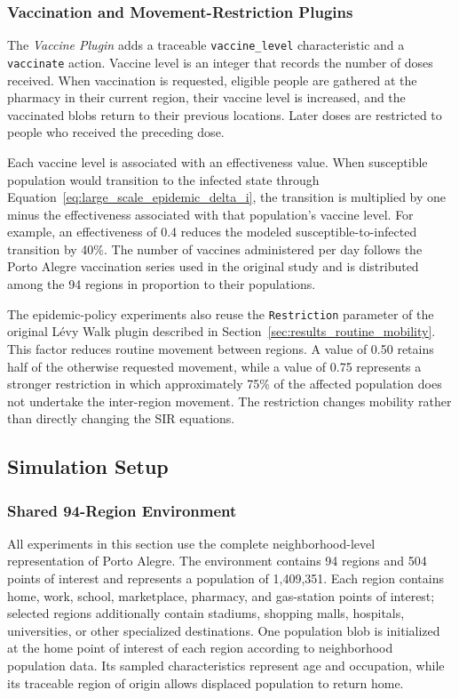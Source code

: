 \subsubsection{Vaccination and Movement-Restriction Plugins}

The \textit{Vaccine Plugin} adds a traceable \texttt{vaccine\_level} characteristic and a \texttt{vaccinate} action. Vaccine level is an integer that records the number of doses received. When vaccination is requested, eligible people are gathered at the pharmacy in their current region, their vaccine level is increased, and the vaccinated blobs return to their previous locations. Later doses are restricted to people who received the preceding dose.

Each vaccine level is associated with an effectiveness value. When susceptible population would transition to the infected state through Equation~\ref{eq:large_scale_epidemic_delta_i}, the transition is multiplied by one minus the effectiveness associated with that population's vaccine level. For example, an effectiveness of 0.4 reduces the modeled susceptible-to-infected transition by 40\%. The number of vaccines administered per day follows the Porto Alegre vaccination series used in the original study and is distributed among the 94 regions in proportion to their populations.

The epidemic-policy experiments also reuse the \texttt{Restriction} parameter of the original L\'evy Walk plugin described in Section~\ref{sec:results_routine_mobility}. This factor reduces routine movement between regions. A value of 0.50 retains half of the otherwise requested movement, while a value of 0.75 represents a stronger restriction in which approximately 75\% of the affected population does not undertake the inter-region movement. The restriction changes mobility rather than directly changing the SIR equations.

\subsection{Simulation Setup}
\label{sec:large_scale_epidemic_setup}

\subsubsection{Shared 94-Region Environment}

All experiments in this section use the complete neighborhood-level representation of Porto Alegre. The environment contains 94 regions and 504 points of interest and represents a population of 1,409,351. Each region contains home, work, school, marketplace, pharmacy, and gas-station points of interest; selected regions additionally contain stadiums, shopping malls, hospitals, universities, or other specialized destinations. One population blob is initialized at the home point of interest of each region according to neighborhood population data. Its sampled characteristics represent age and occupation, while its traceable region of origin allows displaced population to return home.


